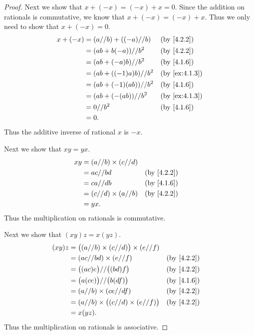 \begin{proof}
  Next we show that \(x + (-x) = (-x) + x = 0\).
  Since the addition on rationals is commutative, we know that \(x + (-x) = (-x) + x\).
  Thus we only need to show that \(x + (-x) = 0\).
  \begin{align*}
    x + (-x) & = (a // b) + ((-a) // b) &  & \by{4.2.2}    \\
             & = (ab + b(-a)) // b^2    &  & \by{4.2.2}    \\
             & = (ab + (-a)b) // b^2    &  & \by{4.1.6}    \\
             & = (ab + ((-1)a)b) // b^2 &  & \by{ex:4.1.3} \\
             & = (ab + (-1)(ab)) // b^2 &  & \by{4.1.6}    \\
             & = (ab + (-(ab)) // b^2   &  & \by{ex:4.1.3} \\
             & = 0 // b^2               &  & \by{4.1.6}    \\
             & = 0.
  \end{align*}
  Thus the additive inverse of rational \(x\) is \(-x\).

  Next we show that \(xy = yx\).
  \begin{align*}
    xy & = (a // b) \times (c // d)                 \\
       & = ac // bd                 &  & \by{4.2.2} \\
       & = ca // db                 &  & \by{4.1.6} \\
       & = (c // d) \times (a // b) &  & \by{4.2.2} \\
       & = yx.
  \end{align*}
  Thus the multiplication on rationals is commutative.

  Next we show that \((xy)z = x(yz)\).
  \begin{align*}
    (xy)z & = \big((a // b) \times (c // d)\big) \times (e // f)                 \\
          & = (ac // bd) \times (e // f)                         &  & \by{4.2.2} \\
          & = \big((ac)e\big) // \big((bd)f\big)                 &  & \by{4.2.2} \\
          & = \big(a(ce)\big) // \big(b(df)\big)                 &  & \by{4.1.6} \\
          & = (a // b) \times (ce // df)                         &  & \by{4.2.2} \\
          & = (a // b) \times \big((c // d) \times (e // f)\big) &  & \by{4.2.2} \\
          & = x(yz).
  \end{align*}
  Thus the multiplication on rationals is associative.


\end{proof}
